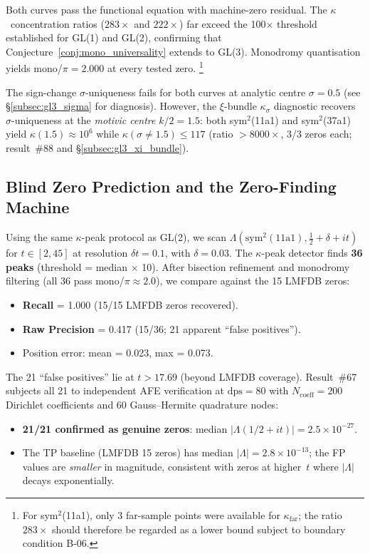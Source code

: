 \documentclass[11pt, a4paper]{article}
\theoremstyle{definition}
\theoremstyle{plain}
\begin{document}
Both curves pass the functional equation with machine-zero residual.  The
$\kappa$~concentration ratios ($283\times$ and $222\times$) far exceed the
100$\times$ threshold established for GL(1) and GL(2), confirming that
Conjecture~\ref{conj:mono_universality} extends to GL(3).  Monodromy quantisation yields mono/$\pi =
2.000$ at every tested zero.%
\footnote{For sym$^2$(11a1), only 3 far-sample points were available for
$\kappa_{\mathrm{far}}$; the ratio $283\times$ should therefore be regarded
as a lower bound subject to boundary condition B-06.}

The sign-change $\sigma$-uniqueness fails for both curves at analytic
centre $\sigma = 0.5$ (see \S\ref{subsec:gl3_sigma} for diagnosis).
However, the $\xi$-bundle $\kappa_\sigma$ diagnostic recovers
$\sigma$-uniqueness at the \emph{motivic centre} $k/2 = 1.5$:
both sym$^2$(11a1) and sym$^2$(37a1) yield $\kappa(1.5) \approx 10^6$
while $\kappa(\sigma \neq 1.5) \leq 117$ (ratio $> 8000\times$, 3/3 zeros each;
result~\#88 and \S\ref{subsec:gl3_xi_bundle}).

\subsection{Blind Zero Prediction and the Zero-Finding Machine}
\label{subsec:gl3_blind}

Using the same $\kappa$-peak protocol as GL(2), we scan
$\Lambda(\mathrm{sym}^2(11\text{a}1), \tfrac{1}{2}+\delta + it)$ for $t \in
[2, 45]$ at resolution $\delta t = 0.1$, with $\delta = 0.03$.  The
$\kappa$-peak detector finds \textbf{36 peaks} (threshold = median $\times$
10).  After bisection refinement and monodromy filtering (all 36 pass
mono/$\pi \approx 2.0$), we compare against the 15 LMFDB zeros:

\begin{itemize}
  \item \textbf{Recall} = 1.000 (15/15 LMFDB zeros recovered).
  \item \textbf{Raw Precision} = 0.417 (15/36; 21 apparent ``false positives'').
  \item Position error: mean = 0.023, max = 0.073.
\end{itemize}

The 21 ``false positives'' lie at $t > 17.69$ (beyond LMFDB coverage).
Result~\#67 subjects all 21 to independent AFE verification at $\mathrm{dps} =
80$ with $N_{\mathrm{coeff}} = 200$ Dirichlet coefficients and 60
Gauss--Hermite quadrature nodes:

\begin{itemize}
  \item \textbf{21/21 confirmed as genuine zeros}: median $|\Lambda(1/2+it)|
        = 2.5 \times 10^{-27}$.
  \item The TP baseline (LMFDB 15 zeros) has median $|\Lambda| = 2.8 \times
        10^{-13}$; the FP values are \emph{smaller} in magnitude, consistent
        with zeros at higher~$t$ where $|\Lambda|$ decays exponentially.
\end{itemize}
\end{document}
